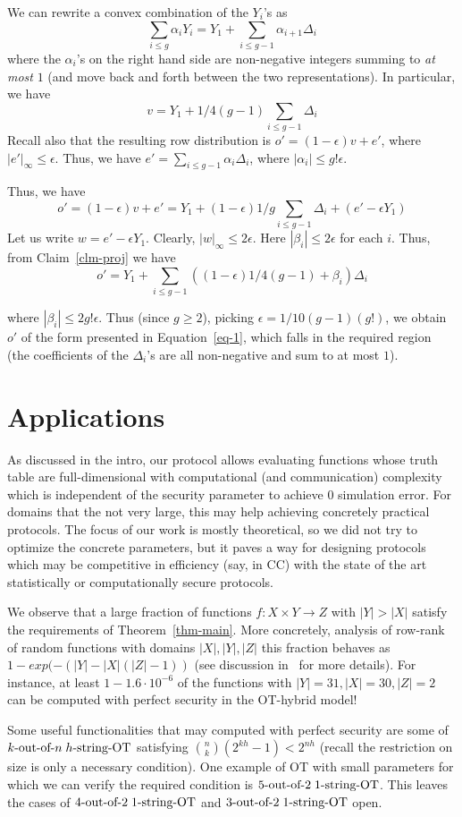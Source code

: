 \documentclass[a4paper]{article}
\newcommand{\sOT}[3]{#1\text{-out-of-}#2\text{\;$#3$-string-OT}}
\begin{document}
We can rewrite a convex combination of the $Y_i$'s as
\begin{equation}\label{eq-1}
\sum_{i\leq g}\alpha_iY_i=Y_1+\sum_{i\leq g-1}\alpha_{i+1} \Delta_i
\end{equation}
where the $\alpha_i$'s on the right hand side are non-negative integers summing to \emph{at most} $1$ (and move back and forth between the two representations). In particular, we have
\[v = Y_1+1/4(g-1)\sum_{i\leq g-1}\Delta_i\]
Recall also that the resulting row distribution is
$o'=(1-\epsilon)v + e'$, where $|e'|_\infty\leq \epsilon$.
Thus, we have $e'=\sum_{i\leq g-1}\alpha_i\Delta_i$, where $|\alpha_i|\leq g!\epsilon$. 

Thus, we have
\[o'=(1-\epsilon)v+e'=Y_1+(1-\epsilon)1/g\sum_{i\leq g-1}\Delta_i+(e'-\epsilon Y_1)\]
Let us write $w=e'-\epsilon Y_1$. Clearly, $|w|_\infty\leq 2\epsilon$.
Here $|\beta_i|\leq 2\epsilon$ for each $i$.
Thus, from Claim~\ref{clm-proj} we have
\[o'= Y_1+\sum_{i\leq g-1}((1-\epsilon)1/4(g-1)+\beta_i)\Delta_i\]

where $|\beta_i|\leq 2g!\epsilon$. Thus (since $g\geq 2$), picking $\epsilon=1/10(g-1)(g!)$, we obtain $o'$ of the form presented in Equation~\ref{eq-1}, which falls in the required region (the coefficients of the $\Delta_i$'s are all non-negative and sum to at most $1$). 


\section{Applications}

As discussed in the intro, our protocol allows evaluating functions whose truth table are full-dimensional with computational (and communication) complexity which is independent of the security parameter to achieve 0 simulation error.
For domains that the not very large, this may help achieving concretely practical protocols. The focus of our work is mostly theoretical, so we did not try to optimize the concrete parameters, but it paves a way for designing protocols which may be competitive in efficiency (say, in CC) with the state of the art statistically or computationally secure protocols.

We observe that a large fraction of functions $f:X\times Y\rightarrow Z$ with $|Y|>|X|$ satisfy the requirements of Theorem~\ref{thm-main}. More concretely, analysis of row-rank of random functions with domains $|X|,|Y|,|Z|$ this fraction behaves
as $1-exp(-(|Y|-|X|(|Z|-1))$ (see discussion in~\cite{Ah14} for more details). For instance, at least $1-1.6\cdot 10^{-6}$ of the functions with $|Y|=31,|X|=30,|Z|=2$ can be computed with perfect security in the OT-hybrid model!

Some useful functionalities that may computed with perfect security are some of $\sOT{k}{n}{h}$ satisfying ${n \choose k} (2^{kh}-1) < 2^{nh}$ (recall the restriction on size is only a necessary condition).
One example of OT with small parameters for which we can verify the required condition is $\sOT{5}{2}{1}$. This leaves the cases of $\sOT{4}{2}{1}$ and $\sOT{3}{2}{1}$ open.




\end{document}
